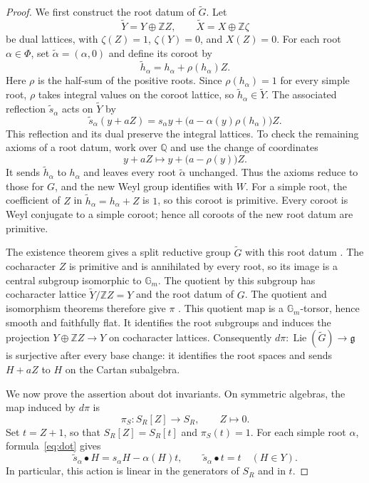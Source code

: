 \documentclass[twoside,a4paper,12pt,reqno]{amsart}
\theoremstyle{remark}
\numberwithin{equation}{section}
\newcommand{\Z}{\mathbb Z}
\newcommand{\Q}{\mathbb Q}
\newcommand{\Gm}{\mathbb G_m}
\newcommand{\fg}{\mathfrak g}
\DeclareMathOperator{\Lie}{Lie}
\begin{document}
\begin{proof}
We first construct the root datum of \(\widetilde G\).
Let
\[
\widetilde Y=Y\oplus\Z Z,\qquad
\widetilde X=X\oplus\Z\zeta
\]
be dual lattices, with \(\zeta(Z)=1\), \(\zeta(Y)=0\), and \(X(Z)=0\).
For each root \(\alpha\in\Phi\), set \(\widetilde\alpha=(\alpha,0)\)
and define its coroot by
\begin{equation}\label{eq:rho-coroots}
\widetilde h_\alpha=h_\alpha+\rho(h_\alpha)Z.
\end{equation}
Here \(\rho\) is the half-sum of the positive roots. Since
\(\rho(h_\alpha)=1\) for every simple root, \(\rho\) takes integral
values on the coroot lattice, so \(\widetilde h_\alpha\in\widetilde Y\).
The associated reflection \(\widetilde s_\alpha\) acts on \(\widetilde Y\) by
\[
\widetilde s_\alpha(y+aZ)
=s_\alpha y+\bigl(a-\alpha(y)\rho(h_\alpha)\bigr)Z.
\]
This reflection and its dual preserve the integral lattices.
To check the remaining axioms of a root datum, work over \(\Q\) and use
the change of coordinates
\[
y+aZ\longmapsto y+\bigl(a-\rho(y)\bigr)Z.
\]
It sends \(\widetilde h_\alpha\) to \(h_\alpha\) and leaves every
root \(\widetilde\alpha\) unchanged. Thus the axioms reduce to those
for \(G\), and the new Weyl group identifies with \(W\).
For a simple root, the coefficient of \(Z\) in
\(\widetilde h_\alpha=h_\alpha+Z\) is \(1\), so this coroot is primitive.
Every coroot is Weyl conjugate to a simple coroot; hence all coroots
of the new root datum are primitive.

The existence theorem gives a split reductive group
\(\widetilde G\) with this root datum \cite[Thm.~6.1.16(2)]{Conrad}.
The cocharacter \(Z\) is primitive and is annihilated by every root,
so its image is a central subgroup isomorphic to \(\Gm\).
The quotient by this subgroup has cocharacter lattice
\(\widetilde Y/\Z Z=Y\) and the root datum of \(G\).
The quotient and isomorphism theorems therefore give \(\pi\)
\cite[Lem.~3.3.1, Cor.~3.3.5 and Thm.~6.1.17]{Conrad}.
This quotient map is a \(\Gm\)-torsor, hence smooth and faithfully flat.
It identifies the root subgroups and induces the projection
\(Y\oplus\Z Z\to Y\) on cocharacter lattices. Consequently
\(d\pi:\Lie(\widetilde G)\to\fg\) is surjective after every base change:
it identifies the root spaces and sends \(H+aZ\) to \(H\) on the
Cartan subalgebra.

We now prove the assertion about dot invariants. On symmetric algebras,
the map induced by \(d\pi\) is
\[
\pi_S:S_R[Z]\longrightarrow S_R,\qquad Z\longmapsto0.
\]
Set \(t=Z+1\), so that \(S_R[Z]=S_R[t]\) and \(\pi_S(t)=1\).
For each simple root \(\alpha\), formula~\eqref{eq:dot} gives
\[
\widetilde s_\alpha\bullet H
=s_\alpha H-\alpha(H)t,\qquad
\widetilde s_\alpha\bullet t=t
\quad(H\in Y).
\]
In particular, this action is linear in the generators of \(S_R\)
and in \(t\).


\end{proof}
\end{document}
